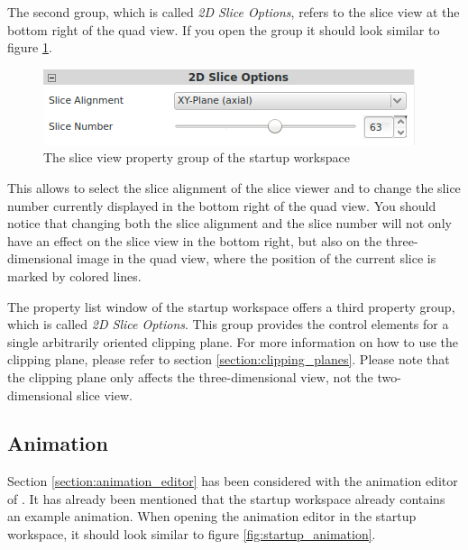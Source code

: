 The second group, which is called \emph{2D Slice Options}, refers to the slice view at the bottom right of the quad view. If you open the
group it should look similar to figure \ref{fig:startup_property}.

\begin{figure}[h]
 \centering
 \includegraphics[scale=0.85,keepaspectratio=true]{./images/startup_property.png}
 \caption{The slice view property group of the startup workspace}
 \label{fig:startup_property}
\end{figure}

This allows to select the slice alignment of the slice viewer and to change the slice number currently displayed in the bottom right of the 
quad view. You should notice that changing both the slice alignment and the slice number will not only have an effect on the slice view
in the bottom right, but also on the three-dimensional
image in the quad view, where the position of the current slice is marked by colored lines.

The property list window of the startup workspace offers a third property group, which is called \emph{2D Slice Options}. This group
provides the control elements for a single arbitrarily oriented clipping plane. For more information on how to use the clipping plane,
please refer to section \ref{section:clipping_planes}. Please note that the clipping plane only affects the three-dimensional view,
not the two-dimensional slice view.

\subsection{Animation}

Section \ref{section:animation_editor} has been considered with the animation editor of \Voreen. It has already been mentioned that 
the startup workspace already contains an example animation. When opening the animation editor in the startup workspace, it should look
similar to figure \ref{fig:startup_animation}.

